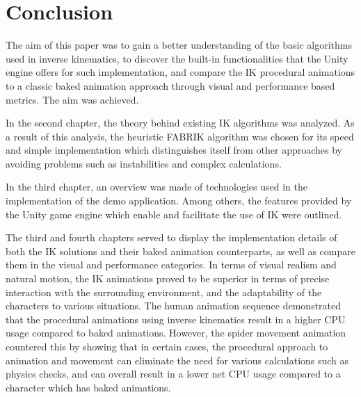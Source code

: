 \chapter{Conclusion} 
The aim of this paper was to gain a better understanding of the basic algorithms
used in inverse kinematics, to discover the built-in functionalities that the Unity
engine offers for such implementation, and compare the IK procedural animations
to a classic baked animation approach through visual and performance based
metrics. The aim was achieved. 

In the second chapter, the theory behind existing IK
algorithms was analyzed. As a result of this analysis, the heuristic FABRIK
algorithm was chosen for its speed and simple implementation which distinguishes
itself from other approaches by avoiding problems such as instabilities and
complex calculations.

In the third chapter, an overview was made of technologies used in the
implementation of the demo application. Among others, the features provided by
the Unity game engine which enable and facilitate the use of IK were outlined.

The third and fourth chapters served to display the implementation details of
both the IK solutions and their baked animation counterparts, as well as compare
them in the visual and performance categories. In terms of visual realism and
natural motion, the IK animations proved to be superior in terms of precise
interaction with the surrounding environment, and the adaptability of the
characters to various situations. The human animation sequence demonstrated that
the procedural animations using inverse kinematics result in a higher CPU usage
compared to baked animations. However, the spider movement animation countered
this by showing that in certain cases, the procedural approach to animation and
movement can eliminate the need for various calculations such as physics checks,
and can overall result in a lower net CPU usage compared to a character which
has baked animations.
